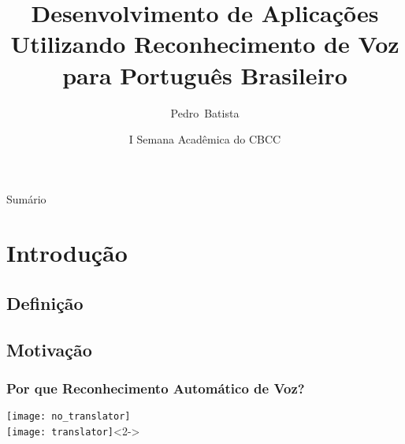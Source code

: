 \documentclass{beamer}
\title[Reconhecimento de Voz para Português Brasileiro] %
{Desenvolvimento de Aplicações Utilizando Reconhecimento de Voz para Português Brasileiro}
\author%
{Pedro~Batista\inst{1}}
\institute %
{
   Laboratório de Processamento de Sinais \\
      Universidade Federal do Pará \\
      http://www.laps.ufpa.br\inst{1}
}
\date[27 de Setembro de 2010] %
{I Semana Acadêmica do CBCC}
\begin{document}
\begin{frame}
\titlepage
\end{frame}

\begin{frame}{Sumário}

\footnotesize
\tableofcontents
\end{frame}



   \section{Introdução}
   \subsection{Definição}

\subsection{Motivação}
\begin{frame}
   \frametitle{Por que Reconhecimento Automático de Voz?}
   \begin{center}
      \texttt{[image: no\_translator]}\\
      \texttt{[image: translator]}<2->
   \end{center}
\end{frame}
\end{document}
